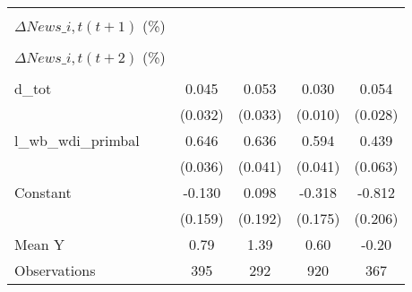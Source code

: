 {\begin{tabular}{l*{4}{c}}
                    &                     &                     &                     &                     \\
\addlinespace
$ \Delta News\_{i,t}(t+1)$ (\%)&                     &                     &                     &                     \\
                    &                     &                     &                     &                     \\
\addlinespace
$ \Delta News\_{i,t}(t+2)$ (\%)&                     &                     &                     &                     \\
                    &                     &                     &                     &                     \\
\addlinespace
d\_tot               &       0.045         &       0.053         &       0.030\sym{***}&       0.054\sym{*}  \\
                    &     (0.032)         &     (0.033)         &     (0.010)         &     (0.028)         \\
\addlinespace
l\_wb\_wdi\_primbal    &       0.646\sym{***}&       0.636\sym{***}&       0.594\sym{***}&       0.439\sym{***}\\
                    &     (0.036)         &     (0.041)         &     (0.041)         &     (0.063)         \\
\addlinespace
Constant            &      -0.130         &       0.098         &      -0.318\sym{*}  &      -0.812\sym{***}\\
                    &     (0.159)         &     (0.192)         &     (0.175)         &     (0.206)         \\
\midrule
Mean Y              &        0.79         &        1.39         &        0.60         &       -0.20         \\
Observations        &         395         &         292         &         920         &         367         \\
\bottomrule
\end{tabular}
}

